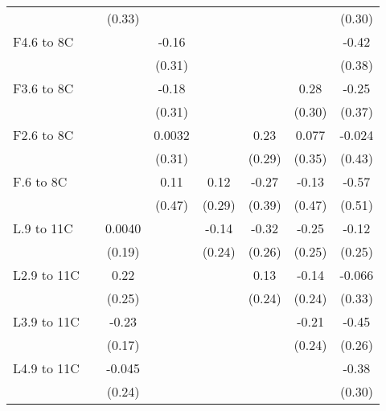 \documentclass[paper=letterpaper, fontsize=11pt]{article} %
\begin{document}
{\begin{landscape}
\begin{longtable}{l*{7}{c}}
                    &            &      (0.33)&            &            &            &            &      (0.30)\\
F4.6 to 8C          &            &            &       -0.16&            &            &            &       -0.42\\
                    &            &            &      (0.31)&            &            &            &      (0.38)\\
F3.6 to 8C          &            &            &       -0.18&            &            &        0.28&       -0.25\\
                    &            &            &      (0.31)&            &            &      (0.30)&      (0.37)\\
F2.6 to 8C          &            &            &      0.0032&            &        0.23&       0.077&      -0.024\\
                    &            &            &      (0.31)&            &      (0.29)&      (0.35)&      (0.43)\\
F.6 to 8C           &            &            &        0.11&        0.12&       -0.27&       -0.13&       -0.57\\
                    &            &            &      (0.47)&      (0.29)&      (0.39)&      (0.47)&      (0.51)\\
L.9 to 11C          &            &      0.0040&            &       -0.14&       -0.32&       -0.25&       -0.12\\
                    &            &      (0.19)&            &      (0.24)&      (0.26)&      (0.25)&      (0.25)\\
L2.9 to 11C         &            &        0.22&            &            &        0.13&       -0.14&      -0.066\\
                    &            &      (0.25)&            &            &      (0.24)&      (0.24)&      (0.33)\\
L3.9 to 11C         &            &       -0.23&            &            &            &       -0.21&       -0.45\\
                    &            &      (0.17)&            &            &            &      (0.24)&      (0.26)\\
L4.9 to 11C         &            &      -0.045&            &            &            &            &       -0.38\\
                    &            &      (0.24)&            &            &            &            &      (0.30)\\

\end{longtable}
\end{landscape}}
\end{document}
